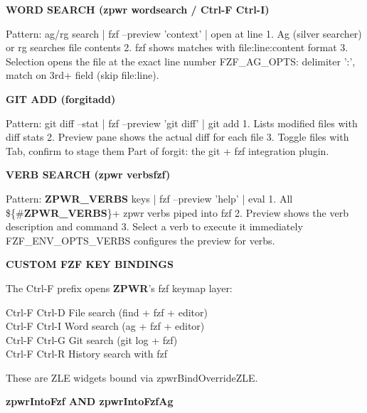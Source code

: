 \documentclass[11pt,a4paper,twoside]{book}
\begin{document}
\vspace{12pt}
{\bfseries\color{neonyellow} WORD SEARCH (zpwr wordsearch / Ctrl-F Ctrl-I)}\vspace{4pt}

Pattern: ag/rg search | fzf --preview 'context' | open at line 1. Ag (silver searcher) or rg searches file contents 2. fzf shows matches with file:line:content format 3. Selection opens the file at the exact line number FZF\_AG\_OPTS: delimiter ':', match on 3rd+ field (skip file:line).


\vspace{12pt}
{\bfseries\color{neonyellow} GIT ADD (forgitadd)}\vspace{4pt}

Pattern: git diff --stat | fzf --preview 'git diff' | git add 1. Lists modified files with diff stats 2. Preview pane shows the actual diff for each file 3. Toggle files with Tab, confirm to stage them Part of forgit: the git + fzf integration plugin.


\vspace{12pt}
{\bfseries\color{neonyellow} VERB SEARCH (zpwr verbsfzf)}\vspace{4pt}

Pattern: \textbf{ZPWR\_VERBS} keys | fzf --preview 'help' | eval 1. All \$\{\#\textbf{ZPWR\_VERBS}\}+ zpwr verbs piped into fzf 2. Preview shows the verb description and command 3. Select a verb to execute it immediately FZF\_ENV\_OPTS\_VERBS configures the preview for verbs.


\vspace{12pt}
{\bfseries\color{neonyellow} CUSTOM FZF KEY BINDINGS}\vspace{4pt}

The Ctrl-F prefix opens \textbf{ZPWR}'s fzf keymap layer:

\begin{codebox}
\color{neongreen}Ctrl-F Ctrl-D   File search (find + fzf + editor)\\
\color{neongreen}Ctrl-F Ctrl-I   Word search (ag + fzf + editor)\\
\color{neongreen}Ctrl-F Ctrl-G   Git search (git log + fzf)\\
\color{neongreen}Ctrl-F Ctrl-R   History search with fzf\\
\end{codebox}

These are ZLE widgets bound via zpwrBindOverrideZLE.


\vspace{12pt}
{\bfseries\color{neonyellow} zpwrIntoFzf AND zpwrIntoFzfAg}\vspace{4pt}
\end{document}
